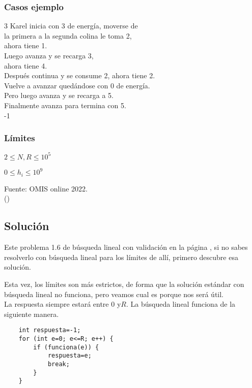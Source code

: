 \subsubsection*{Casos ejemplo}
\begin{casebox3}	
	{3}
	{
		Karel inicia con 3 de energía, moverse de   \\
		la primera a la segunda colina le toma 2,  \\
		ahora tiene 1.\\
		Luego avanza y se recarga 3,\\
		ahora tiene 4.\\
		Después continua y se consume 2, ahora tiene 2. \\
		Vuelve a avanzar quedándose con 0 de energía. \\		
		Pero luego avanza y se recarga a 5. \\
		Finalmente avanza para termina con 5. \\
	}
	{-1}
	{}
	\hline
\end{casebox3}	

\subsubsection*{Límites}
\begin{plimits}
	\item \(2\leq N, R \leq 10^5\)
	\item \(0\leq h_i\leq 10^9\)
\end{plimits}

Fuente: OMIS online 2022.\\
\footnotesize{()}

\subsection*{Solución}
Este problema 1.6 de búsqueda lineal con validación en la página \pageref{bicicleta}, si no sabes resolverlo con búsqueda lineal para los límites de allí, primero descubre esa solución.

Esta vez, los límites son más estrictos, de forma que la solución estándar con búsqueda lineal no funciona, pero veamos cual es porque nos será útil.
\\

La respuesta siempre estará entre \(0\)  y\(R\). La búsqueda lineal funciona de la siguiente manera.
\begin{lstlisting}
	int respuesta=-1;
	for (int e=0; e<=R; e++) {
		if (funciona(e)) {
			respuesta=e;
			break;
		}
	}
\end{lstlisting}


